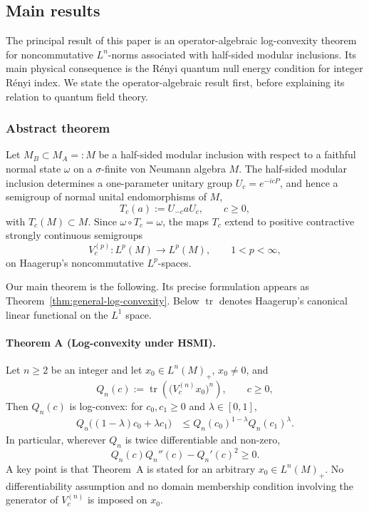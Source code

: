 \documentclass[11pt,a4paper]{article}
\theoremstyle{plain}
\numberwithin{theorem}{section}
\theoremstyle{definition}
\newcommand{\?}{\overset{?}{=}}
\DeclareMathOperator{\tr}{tr}
\begin{document}
\subsection{Main results}
The principal result of this paper is an operator-algebraic log-convexity
theorem for noncommutative \(L^n\)-norms associated with half-sided modular
inclusions.  Its main physical consequence is the R\'enyi quantum null energy
condition for integer R\'enyi index.  We state the operator-algebraic result
first, before explaining its relation to quantum field theory.

\subsubsection{Abstract theorem}
Let \(M_B\subset M_A=:M\) be a half-sided modular inclusion with respect to a
faithful normal state \(\omega\) on a \(\sigma\)-finite von Neumann algebra
\(M\).  The half-sided modular inclusion determines a one-parameter unitary group \(U_c=e^{-icP}\), and hence a semigroup of normal
unital endomorphisms of \(M\),
\begin{equation}\label{eq:intro-Tc}
        T_c(a):=U_{-c}aU_c,
        \qquad c\geq0,
\end{equation}
with \(T_c(M)\subset M\).  Since \(\omega\circ T_c=\omega\), the maps \(T_c\)
extend to positive contractive strongly continuous semigroups
\[
        V_c^{(p)}:L^p(M)\longrightarrow L^p(M),
        \qquad 1<p<\infty,
\]
on Haagerup's noncommutative \(L^p\)-spaces.

Our main theorem is the following. Its precise formulation appears as
Theorem~\ref{thm:general-log-convexity}. Below $\tr$ denotes Haagerup's canonical linear functional on the $L^1$ space. 

\paragraph*{Theorem A (Log-convexity under HSMI).}
Let \(n\geq2\) be an integer and let \(x_0\in L^n(M)_+\), $x_0\neq0$, and
\begin{equation}\label{eq:intro-Qn}
        Q_n(c)
        :=
        \tr\left(\bigl(V_c^{(n)}x_0\bigr)^n\right),
        \qquad c\geq0,
\end{equation}
Then $Q_n(c)$ is log-convex: for \(c_0,c_1\geq0\) and
\(\lambda\in[0,1]\),
\begin{equation}\label{eq:intro-log-convexity}
\begin{aligned}
        Q_n\bigl((1-\lambda)c_0+\lambda c_1\bigr)
        &\leq
        Q_n(c_0)^{1-\lambda}Q_n(c_1)^\lambda .
\end{aligned}
\end{equation}
In particular, wherever \(Q_n\) is twice differentiable and non-zero,
\begin{equation}
        Q_n(c)Q_n''(c)-Q_n'(c)^2\geq0.
\end{equation}
A key point is that Theorem~A is stated for an arbitrary
\(x_0\in L^n(M)_+\).  No differentiability assumption and no domain membership
condition involving the generator of \(V_c^{(n)}\) is imposed on \(x_0\). 
\end{document}

